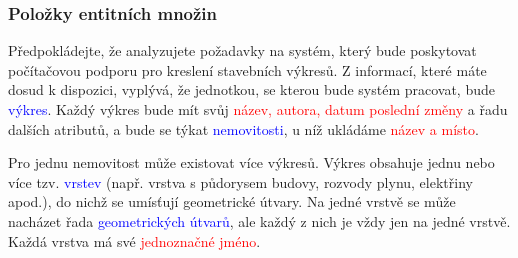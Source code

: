 \documentclass{beamer}
\begin{document}
{
{
\begin{frame}[plain]
\end{frame}
}
  \begin{frame}
    \frametitle{Položky entitních množin}
    \scriptsize{
    \hspace{0.5cm}Předpokládejte, že analyzujete požadavky na systém, který bude poskytovat počítačovou
    podporu pro kreslení stavebních výkresů. Z informací, které máte dosud k dispozici,
    vyplývá, že jednotkou, se kterou bude systém pracovat, bude \textcolor{blue}{výkres}. Každý výkres bude
    mít svůj \textcolor{red}{název, autora, datum poslední změny} a řadu dalších atributů, a bude se týkat
    \textcolor{blue}{nemovitosti}, u níž ukládáme \textcolor{red}{název a místo}.\par


    \hspace{0.5cm}Pro jednu nemovitost může existovat více výkresů. Výkres obsahuje jednu nebo více tzv.
    \textcolor{blue}{vrstev} (např. vrstva s půdorysem budovy, rozvody plynu, elektřiny apod.), do nichž se
    umísťují geometrické útvary. Na jedné vrstvě se může nacházet řada \textcolor{blue}{geometrických útvarů},
    ale každý z nich je vždy jen na jedné vrstvě. Každá vrstva má své \textcolor{red}{jednoznačné jméno}.\par


}
\end{frame}}
\end{document}
